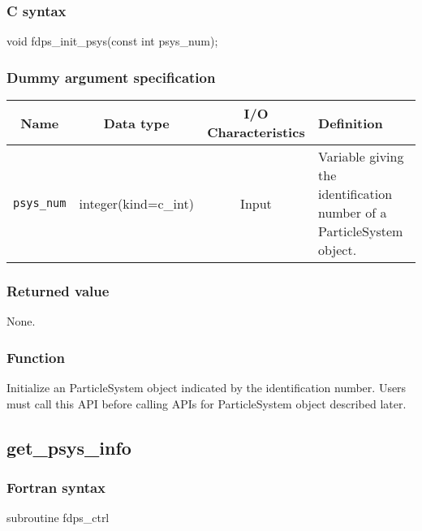\subsubsection*{C syntax}
\begin{screen}
\begin{spverbatim}
void fdps_init_psys(const int psys_num);
\end{spverbatim}
\end{screen}

\subsubsection*{Dummy argument specification}
\begin{table}[h]
\begin{tabularx}{\linewidth}{cccX}
\toprule
\rowcolor{Snow2}
Name & Data type & I/O Characteristics & Definition \\    
\midrule
\texttt{psys\_num} & integer(kind=c\_int) & Input & Variable giving the identification number of a ParticleSystem object.\\
\bottomrule
\end{tabularx}
\end{table}

\subsubsection*{Returned value}
None.

\subsubsection*{Function}
Initialize an ParticleSystem object indicated by the identification number. Users must call this API before calling APIs for ParticleSystem object described later.

\clearpage

\subsection{get\_psys\_info}
\subsubsection*{Fortran syntax}
\begin{screen}
\begin{spverbatim}
subroutine fdps_ctrl%
\end{spverbatim}
\end{screen}

